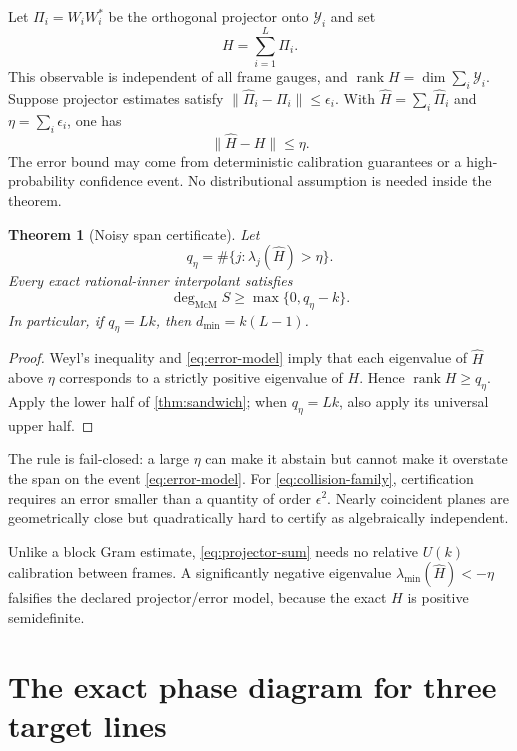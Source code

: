 \documentclass[11pt]{article}
\newtheorem{theorem}{Theorem}[section]
\theoremstyle{definition}
\theoremstyle{remark}
\newcommand{\rank}{\operatorname{rank}}
\newcommand{\mcdeg}{\deg_{\mathrm{McM}}}
\newcommand{\norm}[1]{\lVert#1\rVert}
\begin{document}
Let $\Pi_i=W_iW_i^*$ be the orthogonal projector onto $\mathcal Y_i$ and set
\begin{equation}\label{eq:projector-sum}
                           H=\sum_{i=1}^L\Pi_i.
\end{equation}
This observable is independent of all frame gauges, and
$\rank H=\dim\sum_i\mathcal Y_i$.  Suppose projector estimates satisfy
$\norm{\widehat\Pi_i-\Pi_i}\le\epsilon_i$.  With
$\widehat H=\sum_i\widehat\Pi_i$ and $\eta=\sum_i\epsilon_i$, one has
\begin{equation}\label{eq:error-model}
                         \norm{\widehat H-H}\le\eta.
\end{equation}
The error bound may come from deterministic calibration guarantees or a
high-probability confidence event.  No distributional assumption is needed
inside the theorem.

\begin{theorem}[Noisy span certificate]\label{thm:noisy}
Let
\[
 q_\eta=\#\{j:\lambda_j(\widehat H)>\eta\}.
\]
Every exact rational-inner interpolant satisfies
\begin{equation}\label{eq:noisy-bound}
                        \mcdeg S\ge\max\{0,q_\eta-k\}.
\end{equation}
In particular, if $q_\eta=Lk$, then $d_{\min}=k(L-1)$.
\end{theorem}

\begin{proof}
Weyl's inequality and \eqref{eq:error-model} imply that each eigenvalue of
$\widehat H$ above $\eta$ corresponds to a strictly positive eigenvalue of
$H$.  Hence $\rank H\ge q_\eta$.  Apply the lower half of
\cref{thm:sandwich}; when $q_\eta=Lk$, also apply its universal upper half.
\end{proof}

The rule is fail-closed: a large $\eta$ can make it abstain but cannot make it
overstate the span on the event \eqref{eq:error-model}.  For
\eqref{eq:collision-family}, certification requires an error smaller than a
quantity of order $\epsilon^2$.  Nearly coincident planes are geometrically
close but quadratically hard to certify as algebraically independent.

Unlike a block Gram estimate, \eqref{eq:projector-sum} needs no relative
$U(k)$ calibration between frames.  A significantly negative eigenvalue
$\lambda_{\min}(\widehat H)<-\eta$ falsifies the declared projector/error
model, because the exact $H$ is positive semidefinite.

\section{The exact phase diagram for three target lines}\label{sec:three}
\end{document}
